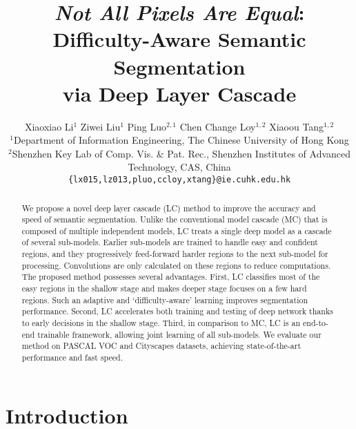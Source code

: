 \documentclass[10pt,twocolumn,letterpaper]{article}
\begin{document}
\title{\textit{Not All Pixels Are Equal}: Difficulty-Aware Semantic Segmentation \\ via Deep Layer Cascade}

\author{Xiaoxiao Li$^{1}$ \hspace{9pt} Ziwei Liu$^{1}$ \hspace{9pt} Ping Luo$^{2,1}$ \hspace{9pt} Chen Change Loy$^{1,2}$ \hspace{8pt} Xiaoou Tang$^{1,2}$\\
$^1$\small{Department of Information Engineering, The Chinese University of Hong Kong}\\
$^2$\small{Shenzhen Key Lab of Comp. Vis. \& Pat. Rec., Shenzhen Institutes of Advanced Technology, CAS, China}\\
{\tt\small \{lx015,lz013,pluo,ccloy,xtang\}@ie.cuhk.edu.hk}
}

\maketitle


\begin{abstract}
We propose a novel deep layer cascade (LC) method to improve the accuracy and speed of semantic segmentation. Unlike the conventional model cascade (MC) that is composed of multiple independent models, LC treats a single deep model as a cascade of several sub-models.
Earlier sub-models are trained to handle easy and confident regions, and they progressively feed-forward harder regions to the next sub-model for processing.
Convolutions are only calculated on these regions to reduce computations.
The proposed method possesses several advantages.
First, LC classifies most of the easy regions in the shallow stage and makes deeper stage focuses on a few hard regions. Such an adaptive and `difficulty-aware' learning
improves segmentation performance.
Second, LC accelerates both training and testing of deep network thanks to early decisions in the shallow stage.
Third, in comparison to MC, LC is an end-to-end trainable framework, allowing joint learning of all sub-models.
We evaluate our method on PASCAL VOC and Cityscapes datasets, achieving state-of-the-art performance and fast speed.  \end{abstract}

\section{Introduction}
\label{sec:intro}
\end{document}
